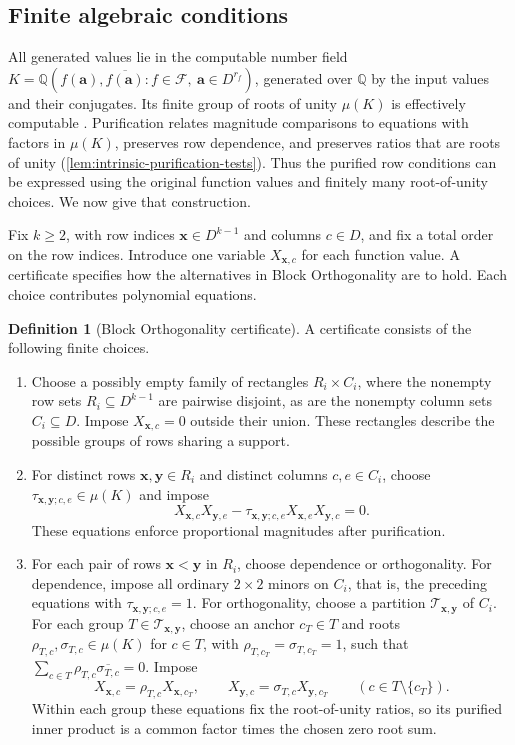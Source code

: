 \documentclass[11pt,letterpaper,onecolumn]{article}
\theoremstyle{plain}
\theoremstyle{definition}
\newtheorem{definition}[definition]{Definition}
\theoremstyle{remark}
\newcommand{\cF}{\mathcal F}
\begin{document}
\subsection{Finite algebraic conditions}
\label{s:subsec:finite-algebraic-conditions}

All generated values lie in the computable number field
$K=\mathbb Q(f(\mathbf a),\overline{f(\mathbf a)}:
f\in\cF,\ \mathbf a\in D^{r_f})$, generated over $\mathbb Q$ by
the input values and their conjugates.
Its finite group of roots of unity $\mu(K)$ is effectively computable
\cite[Algorithm~4.9.10]{Cohen1993}.
Purification relates magnitude comparisons to equations with factors in
$\mu(K)$, preserves row dependence, and preserves ratios that are roots
of unity (\cref{lem:intrinsic-purification-tests}). Thus the purified
row conditions can be expressed using the original function values and
finitely many root-of-unity choices. We now give that construction.

Fix $k\ge2$, with row indices $\mathbf x\in D^{k-1}$ and columns
$c\in D$, and fix a total order on the row indices.
Introduce one variable $X_{\mathbf x,c}$ for each function
value. A certificate specifies how the alternatives in Block
Orthogonality are to hold. Each choice contributes polynomial equations.

\begin{definition}[Block Orthogonality certificate]
\label{s:def:certificate}
A certificate consists of the following finite choices.
\begin{enumerate}
\item Choose a possibly empty family of rectangles $R_i\times C_i$,
where the nonempty row sets $R_i\subseteq D^{k-1}$ are pairwise
disjoint, as are the nonempty column sets $C_i\subseteq D$.
Impose $X_{\mathbf x,c}=0$ outside their union. These rectangles
describe the possible groups of rows sharing a support.
\item For distinct rows $\mathbf x,\mathbf y\in R_i$ and distinct
columns $c,e\in C_i$, choose $\tau_{\mathbf x,\mathbf y;c,e}\in\mu(K)$
and impose
\[
 X_{\mathbf x,c}X_{\mathbf y,e}
 -\tau_{\mathbf x,\mathbf y;c,e}X_{\mathbf x,e}X_{\mathbf y,c}=0.
\]
These equations enforce proportional magnitudes after purification.
\item For each pair of rows $\mathbf x<\mathbf y$ in $R_i$, choose
dependence or orthogonality. For dependence, impose all ordinary
$2\times2$ minors on $C_i$, that is, the preceding equations with
$\tau_{\mathbf x,\mathbf y;c,e}=1$. For orthogonality, choose a partition
$\mathcal T_{\mathbf x,\mathbf y}$ of $C_i$. For each group
$T\in\mathcal T_{\mathbf x,\mathbf y}$, choose an anchor $c_T\in T$ and
roots $\rho_{T,c},\sigma_{T,c}\in\mu(K)$ for $c\in T$, with
$\rho_{T,c_T}=\sigma_{T,c_T}=1$, such that
$\sum_{c\in T}\rho_{T,c}\overline{\sigma_{T,c}}=0$. Impose
\[
 X_{\mathbf x,c}=\rho_{T,c}X_{\mathbf x,c_T},\qquad
 X_{\mathbf y,c}=\sigma_{T,c}X_{\mathbf y,c_T}
 \qquad(c\in T\setminus\{c_T\}).
\]
Within each group these equations fix the root-of-unity ratios, so
its purified inner product is a common factor times the chosen zero
root sum.
\end{enumerate}
\end{definition}
\end{document}
